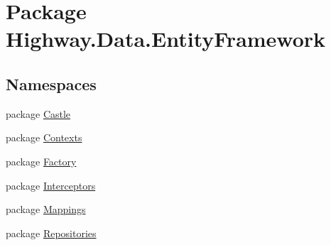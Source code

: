 \hypertarget{namespace_highway_1_1_data_1_1_entity_framework}{\section{Package Highway.\-Data.\-Entity\-Framework}
\label{namespace_highway_1_1_data_1_1_entity_framework}
}
\subsection*{Namespaces}
\begin{DoxyCompactItemize}
\item 
package \hyperlink{namespace_highway_1_1_data_1_1_entity_framework_1_1_castle}{Castle}
\item 
package \hyperlink{namespace_highway_1_1_data_1_1_entity_framework_1_1_contexts}{Contexts}
\item 
package \hyperlink{namespace_highway_1_1_data_1_1_entity_framework_1_1_factory}{Factory}
\item 
package \hyperlink{namespace_highway_1_1_data_1_1_entity_framework_1_1_interceptors}{Interceptors}
\item 
package \hyperlink{namespace_highway_1_1_data_1_1_entity_framework_1_1_mappings}{Mappings}
\item 
package \hyperlink{namespace_highway_1_1_data_1_1_entity_framework_1_1_repositories}{Repositories}
\end{DoxyCompactItemize}
